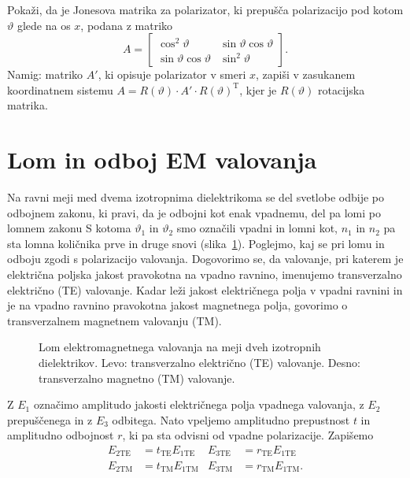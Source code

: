 \begin{definition}
Pokaži, da je Jonesova matrika za polarizator,
ki prepušča polarizacijo pod kotom $\vartheta$ glede na os $x$, podana z matriko
\begin{equation}
A=\left[\begin{array}{cc}
\cos^{2}\vartheta & \sin\vartheta\cos\vartheta\\
\sin\vartheta\cos\vartheta & \sin^{2}\vartheta
\end{array}\right].
\end{equation}
Namig: matriko $A'$, ki opisuje polarizator v smeri $x$, zapiši v zasukanem
koordinatnem sistemu $A=R(\vartheta) \cdot {A'}\cdot R(\vartheta)^\textrm{T}$, 
kjer je $R(\vartheta)$ rotacijska matrika.
\end{definition}

\section{Lom in odboj EM valovanja}
Na ravni meji med dvema izotropnima dielektrikoma se del svetlobe
odbije po odbojnem zakonu, ki pravi, da je odbojni kot enak vpadnemu, 
del pa lomi po lomnem zakonu 
S kotoma $\vartheta_{1}$ in $\vartheta_{2}$ smo označili vpadni in lomni
kot, $n_{1}$ in $n_{2}$ pa sta lomna količnika prve in druge snovi (slika~\ref{fig:Lom}).
Poglejmo, kaj se pri lomu in odboju zgodi s polarizacijo valovanja.
Dogovorimo se, da valovanje, pri katerem je električna poljska jakost pravokotna 
na vpadno ravnino, imenujemo transverzalno električno (TE) 
valovanje. Kadar leži jakost električnega polja v
vpadni ravnini in je na vpadno ravnino pravokotna jakost magnetnega polja,
govorimo o transverzalnem magnetnem valovanju (TM).\\

\begin{figure}[h]
\centering {} 
  
\caption{Lom elektromagnetnega valovanja na meji dveh izotropnih dielektrikov. 
Levo: transverzalno električno (TE) valovanje. Desno: transverzalno magnetno (TM) valovanje.}
\label{fig:Lom}
\end{figure}

Z $E_1$ označimo amplitudo jakosti električnega polja vpadnega valovanja, 
z $E_2$ prepuščenega in z $E_3$ odbitega.
Nato vpeljemo amplitudno prepustnost $t$ in amplitudno odbojnost $r$, 
ki pa sta odvisni od vpadne polarizacije. Zapišemo
\begin{align}
E_{2\mathrm{TE}} & =t_{\mathrm{TE}}E_{1\mathrm{TE}} & E_{3\mathrm{TE}} &=r_{\mathrm{TE}}E_{1\mathrm{TE}}\\
E_{2\mathrm{TM}} & =t_{\mathrm{TM}}E_{1\mathrm{TM}} & E_{3\mathrm{TM}}&=r_{\mathrm{TM}}E_{1\mathrm{TM}}.
\end{align}

